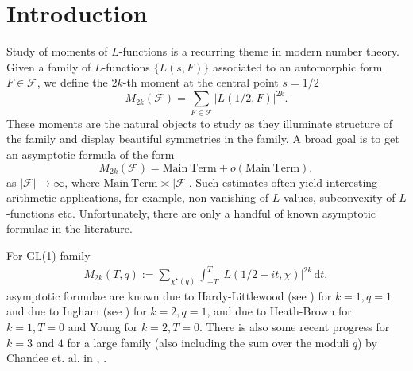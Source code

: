 \documentclass[12pt,a4paper,twoside, reqno]{amsart}
\begin{document}
\section{Introduction}
Study of moments of  $L$-functions is a recurring theme  in modern  number theory.  Given a family  of $L$-functions $\{L(s, F)  \}$ associated to an  automorphic form $F \in  \mathcal{F}$, we define the $2k$-th moment at the central point $s=1/2$ 
\[M_{2k}(\mathcal{F})= \sum_{F \in \mathcal{F}}|L(1/2, F)|^{2k}.\]
These moments
are  the  natural objects to study as they illuminate
structure of the family and display beautiful symmetries in the family. A broad goal  is to get an asymptotic formula of the form
\[M_{2k}(\mathcal{F})= \mathrm{Main \ Term}+ o(\mathrm{Main \ Term}),\]
as $|\mathcal{F}| \rightarrow \infty$, where $\mathrm{Main \ Term} \asymp |\mathcal{F}|$.
Such estimates often yield  interesting arithmetic applications, for example, non-vanishing of $L$-values, subconvexity of $L$-functions etc. 
Unfortunately, there are only a handful of known asymptotic formulae in the literature. 

For GL(1) family
\begin{align}\label{zeta}
   M_{2k}(T,q):= \sum_{\chi^{\star}(q)}\int_{-T}^{T} |L(1/2+it, \chi)|^{2k} \, \mathrm{d}t,
\end{align}
asymptotic formulae are known due to Hardy-Littlewood (see \cite{T}) for $k=1,q=1$ and due to Ingham (see \cite{T})   for $k=2,q=1$, and  due to  Heath-Brown \cite{HB81} for $k=1, T=0$ and  Young \cite{Y07} for $k=2,T=0$.  There is also  some recent progress for $k=3$ and $4$ for a large family (also including the sum over the moduli $q$) by Chandee et. al. in  \cite{CLMR23}, \cite{CLMR24}.
\end{document}
